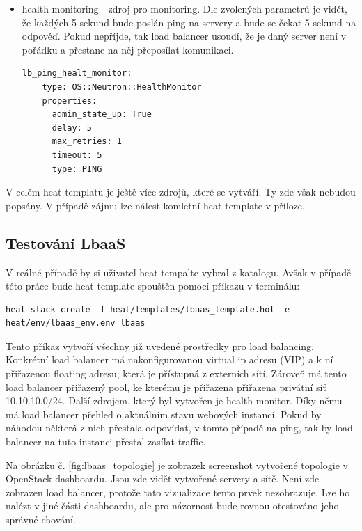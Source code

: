 \begin{itemize}
\item health monitoring - zdroj pro monitoring. Dle zvolených parametrů je vidět, že každých 5 sekund bude poslán ping na servery a bude se čekat 5 sekund na odpověď. Pokud nepříjde, tak load balancer usoudí, že je daný server není v pořádku a přestane na něj přeposílat komunikaci.

\begin{lstlisting}[caption=Monitor]
  lb_ping_healt_monitor:
    type: OS::Neutron::HealthMonitor
    properties:
      admin_state_up: True
      delay: 5
      max_retries: 1
      timeout: 5
      type: PING
\end{lstlisting}
\end{itemize}

V celém heat templatu je ještě více zdrojů, které se vytváří. Ty zde však nebudou popsány. V případě zájmu lze nálest komletní heat template v příloze. 

\subsection{Testování LbaaS}\label{sub:interaction}

V reálné případě by si uživatel heat tempalte vybral z katalogu. Avšak v případě této práce bude heat template spouštěn pomocí příkazu v terminálu:

\begin{lstlisting}
heat stack-create -f heat/templates/lbaas_template.hot -e heat/env/lbaas_env.env lbaas
\end{lstlisting}

Tento příkaz vytvoří všechny již uvedené prostředky pro load balancing. Konkrétní load balancer má nakonfigurovanou virtual ip adresu (VIP) a k ní přiřazenou floating adresu, která je přístupná z externích sítí. Zároveň má tento load balancer přiřazený pool, ke kterému je přiřazena přiřazena privátní síť 10.10.10.0/24. Další zdrojem, který byl vytvořen je health monitor. Díky němu má load balancer přehled o aktuálním stavu webových instancí. Pokud by náhodou některá z nich přestala odpovídat, v tomto případě na ping, tak by load balancer na tuto instanci přestal zasílat traffic.

Na obrázku č. \ref{fig:lbaas_topologie} je zobrazek screenshot vytvořené topologie v OpenStack dashboardu. Jsou zde vidět vytvořené servery a sítě. Není zde zobrazen load balancer, protože tato vizualizace tento prvek nezobrazuje. Lze ho nalézt v jiné části dashboardu, ale pro názornost bude rovnou otestováno jeho správné chování.

